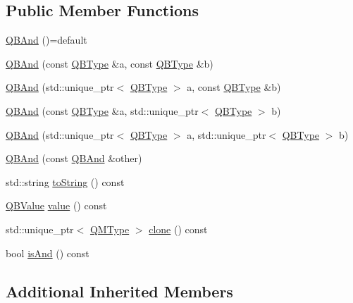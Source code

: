 \subsection*{Public Member Functions}
\begin{DoxyCompactItemize}
\item 
\hyperlink{classQuickMath_1_1QBAnd_a77f6a049fa5aed5e5e0891ab786a302d}{Q\+B\+And} ()=default
\item 
\hyperlink{classQuickMath_1_1QBAnd_a826a9fd7bf5bb6b2a11f0b72efe48683}{Q\+B\+And} (const \hyperlink{classQuickMath_1_1QBType}{Q\+B\+Type} \&a, const \hyperlink{classQuickMath_1_1QBType}{Q\+B\+Type} \&b)
\item 
\hyperlink{classQuickMath_1_1QBAnd_ac40420b64b8eafda7d8f0f5098665d46}{Q\+B\+And} (std\+::unique\+\_\+ptr$<$ \hyperlink{classQuickMath_1_1QBType}{Q\+B\+Type} $>$ a, const \hyperlink{classQuickMath_1_1QBType}{Q\+B\+Type} \&b)
\item 
\hyperlink{classQuickMath_1_1QBAnd_a95861de48ff7878bb513037bd70f80d1}{Q\+B\+And} (const \hyperlink{classQuickMath_1_1QBType}{Q\+B\+Type} \&a, std\+::unique\+\_\+ptr$<$ \hyperlink{classQuickMath_1_1QBType}{Q\+B\+Type} $>$ b)
\item 
\hyperlink{classQuickMath_1_1QBAnd_a5e7578afa55e126db11feaf5139119a7}{Q\+B\+And} (std\+::unique\+\_\+ptr$<$ \hyperlink{classQuickMath_1_1QBType}{Q\+B\+Type} $>$ a, std\+::unique\+\_\+ptr$<$ \hyperlink{classQuickMath_1_1QBType}{Q\+B\+Type} $>$ b)
\item 
\hyperlink{classQuickMath_1_1QBAnd_a687345007975f87155350b33be4da198}{Q\+B\+And} (const \hyperlink{classQuickMath_1_1QBAnd}{Q\+B\+And} \&other)
\item 
std\+::string \hyperlink{classQuickMath_1_1QBAnd_abf6c063e663077fdddc4aae96bfbca27}{to\+String} () const 
\item 
\hyperlink{namespaceQuickMath_aec13b08c42d9f8e688241623c8b379a0}{Q\+B\+Value} \hyperlink{classQuickMath_1_1QBAnd_abd8953fcd0d25729cec8c7d78355d217}{value} () const 
\item 
std\+::unique\+\_\+ptr$<$ \hyperlink{classQuickMath_1_1QMType}{Q\+M\+Type} $>$ \hyperlink{classQuickMath_1_1QBAnd_a2a2957570e1b333c6190ecf1526c3124}{clone} () const 
\item 
bool \hyperlink{classQuickMath_1_1QBAnd_a9c722c8c7f3826faded75d70dd0f406c}{is\+And} () const 
\end{DoxyCompactItemize}
\subsection*{Additional Inherited Members}


